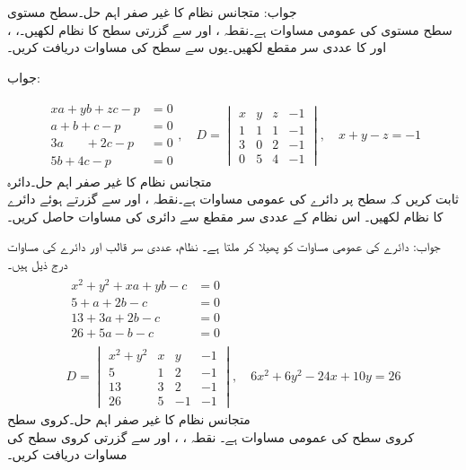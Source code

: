 جواب:  
\quad متجانس نظام کا غیر صفر اہم حل۔سطح مستوی\\
سطح مستوی کی عمومی مساوات  ہے۔نقطہ ،  اور  سے گزرتی سطح کا نظام لکھیں۔، ،  اور  کا عددی سر مقطع  لکھیں۔یوں  سے سطح کی مساوات دریافت کریں۔

جواب:

\begin{gather*}
\begin{aligned}
xa+yb+zc-p&=0\\
a+b+c-p&=0\\
3a\phantom{+yb}+2c-p&=0\\
5b+4c-p&=0
\end{aligned},\quad 
D=\begin{vmatrix}
x&y&z&-1\\ 1&1&1&-1\\3&0&2&-1\\0&5&4&-1
\end{vmatrix},\quad x+y-z=-1
\end{gather*}
\quad متجانس نظام کا غیر صفر اہم حل۔دائرہ\\
ثابت کریں کہ  سطح پر دائرے کی عمومی مساوات  ہے۔نقطہ ،  اور  سے گزرتے ہوئے دائرے کا نظام لکھیں۔ اس نظام کے عددی سر مقطع سے دائری کی مساوات حاصل کریں۔ 




جواب: دائرے کی عمومی مساوات   کو پھیلا کر  ملتا ہے۔ نظام، عددی سر قالب اور دائرے کی مساوات درج ذیل ہیں۔
\begin{gather*}
\begin{aligned}
x^2+y^2+xa+yb-c&=0\\
5+a+2b-c&=0\\
13+3a+2b-c&=0\\
26+5a-b-c&=0
\end{aligned}\\ 
D=
\begin{vmatrix}
x^2+y^2&x&y&-1\\5&1&2&-1\\13&3&2&-1\\26&5&-1&-1
\end{vmatrix},\quad 
6x^2+6y^2-24x+10y=26
\end{gather*}
\quad متجانس نظام کا غیر صفر اہم حل۔کروی سطح\\
کروی سطح کی عمومی مساوات  ہے۔ نقطہ ، ،   اور  سے گزرتی کروی سطح کی مساوات دریافت کریں۔

